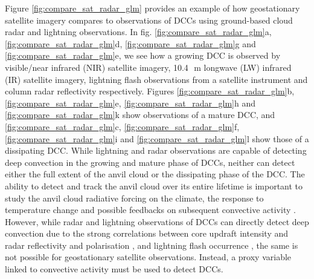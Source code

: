 
Figure \ref{fig:compare_sat_radar_glm} provides an example of how geostationary satellite imagery compares to observations of DCCs using ground-based cloud radar and lightning observations.
In fig. \ref{fig:compare_sat_radar_glm}a, \ref{fig:compare_sat_radar_glm}d, \ref{fig:compare_sat_radar_glm}g and \ref{fig:compare_sat_radar_glm}e, we see how a growing DCC is observed by visible/near infrared (NIR) satellite imagery, 10.4\,\unit{\mu m} longwave (LW) infrared (IR) satellite imagery, lightning flash observations from a satellite instrument and column radar reflectivity respectively.
Figures \ref{fig:compare_sat_radar_glm}b, \ref{fig:compare_sat_radar_glm}e, \ref{fig:compare_sat_radar_glm}h and \ref{fig:compare_sat_radar_glm}k show observations of a mature DCC, and \ref{fig:compare_sat_radar_glm}c, \ref{fig:compare_sat_radar_glm}f, \ref{fig:compare_sat_radar_glm}i and \ref{fig:compare_sat_radar_glm}l show those of a dissipating DCC.
While lightning and radar observations are capable of detecting deep convection in the growing and mature phase of DCCs, neither can detect either the full extent of the anvil cloud or the dissipating phase of the DCC.
The ability to detect and track the anvil cloud over its entire lifetime is important to study the anvil cloud radiative forcing on the climate, the response to temperature change \citep{bony_thermodynamic_2016, hartmann_tropical_2016, ceppi_cloud_2017, gasparini_what_2019} and possible feedbacks on subsequent convective activity \citep{varble_erroneous_2018}.
However, while radar and lightning observations of DCCs can directly detect deep convection due to the strong correlations between core updraft intensity and radar reflectivity and polarisation \citep{austin_relation_1987, rosenfeld_general_1993, zipser_vertical_1994},  and lightning flash occurrence \citep{williams_relationship_1989, deierling_total_2008, wang_relationship_2017}, the same is not possible for geostationary satellite observations.
Instead, a proxy variable linked to convective activity must be used to detect DCCs.

